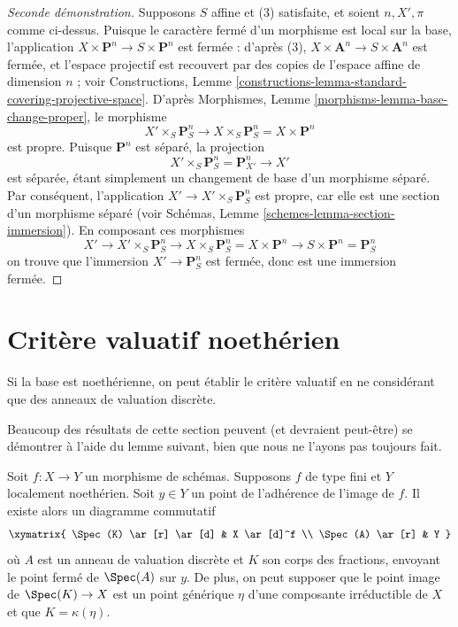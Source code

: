 \begin{proof}[Seconde démonstration]
\medskip\noindent
Supposons $S$ affine et (3) satisfaite, et soient $n, X', \pi$ comme ci-dessus.
Puisque le caractère fermé d'un morphisme est local sur la base, l'application
$X \times \mathbf{P}^n \to S \times \mathbf{P}^n$ est fermée : d'après (3),
$X \times \mathbf{A}^n \to S \times \mathbf{A}^n$ est fermée, et
l'espace projectif est recouvert par des copies de l'espace affine de dimension $n$ ; voir
Constructions,
Lemme \ref{constructions-lemma-standard-covering-projective-space}.
D'après Morphismes, Lemme \ref{morphisms-lemma-base-change-proper},
le morphisme
$$
X' \times_S \mathbf{P}^n_S
\to
X \times_S \mathbf{P}^n_S =
X \times \mathbf{P}^n
$$
est propre. Puisque $\mathbf{P}^n$ est séparé, la projection
$$
X' \times_S \mathbf{P}^n_S = \mathbf{P}^n_{X'} \to X'
$$
est séparée, étant simplement un changement de base d'un morphisme
séparé. Par conséquent, l'application $X' \to X' \times_S \mathbf{P}^n_S$ est propre,
car elle est une section d'un morphisme séparé (voir
Schémas, Lemme \ref{schemes-lemma-section-immersion}).
En composant ces morphismes
$$
X' \to X' \times_S \mathbf{P}^n_S \to X \times_S \mathbf{P}^n_S
= X \times \mathbf{P}^n \to S \times \mathbf{P}^n = \mathbf{P}^n_S
$$
on trouve que l'immersion $X' \to \mathbf{P}^n_S$ est fermée, donc
est une immersion fermée.
\end{proof}

\section{Critère valuatif noethérien}
\label{section-Noetherian-valuative-criterion}

\noindent
Si la base est noethérienne, on peut établir le critère valuatif
en ne considérant que des anneaux de valuation discrète.

\medskip\noindent
Beaucoup des résultats de cette section peuvent (et devraient peut-être)
se démontrer à l'aide du lemme suivant, bien que nous ne l'ayons
pas toujours fait.

\begin{lemma}
\label{lemma-reach-point-closure-Noetherian}
Soit $f : X \to Y$ un morphisme de schémas.
Supposons $f$ de type fini et $Y$ localement noethérien.
Soit $y \in Y$ un point de l'adhérence de l'image de $f$.
Il existe alors un diagramme commutatif
$$
\xymatrix{
\Spec(K) \ar[r] \ar[d] & X \ar[d]^f \\
\Spec(A) \ar[r] & Y
}
$$
où $A$ est un anneau de valuation discrète et $K$ son corps des fractions,
envoyant le point fermé de $\Spec(A)$ sur $y$. De plus, on peut supposer
que le point image de $\Spec(K) \to X$ est un point générique $\eta$
d'une composante irréductible de $X$ et que $K = \kappa(\eta)$.
\end{lemma}

